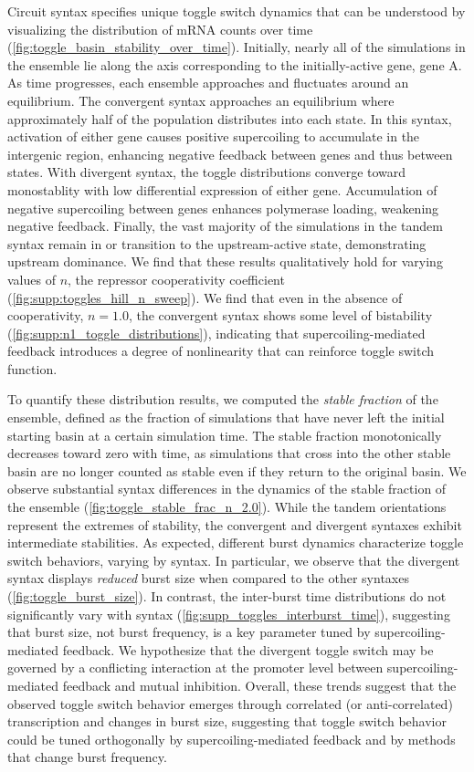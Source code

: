 \documentclass[11pt]{article}
\begin{document}
Circuit syntax specifies unique toggle switch dynamics that can be understood by visualizing the distribution of mRNA counts over time (\cref{fig:toggle_basin_stability_over_time}). Initially, nearly all of the simulations in the ensemble lie along the axis corresponding to the initially-active gene, gene A. As time progresses, each ensemble approaches and fluctuates around an equilibrium.
The convergent syntax approaches an equilibrium where approximately half of the population distributes into each state. In this syntax, activation of either gene causes positive supercoiling to accumulate in the intergenic region, enhancing negative feedback between genes and thus between states. With divergent syntax, the toggle distributions converge toward monostablity with low differential expression of either gene. Accumulation of negative supercoiling between genes enhances polymerase loading, weakening negative feedback. Finally, the vast majority of the simulations in the tandem syntax remain in or transition to the upstream-active state, demonstrating upstream dominance. We find that these results qualitatively hold for varying values of \(n\), the repressor cooperativity coefficient (\cref{fig:supp:toggles_hill_n_sweep}). We find that  even in the absence of cooperativity, \(n = 1.0\), the convergent syntax shows some level of bistability (\cref{fig:supp:n1_toggle_distributions}), indicating that supercoiling-mediated feedback introduces a degree of nonlinearity that can reinforce toggle switch function. 

To quantify these distribution results, we computed the \emph{stable fraction} of the ensemble, defined as the fraction of simulations that have never left the initial starting basin at a certain simulation time.
The stable fraction monotonically decreases toward zero with time, as simulations that cross into the other stable basin are no longer counted as stable even if they return to the original basin.
We observe substantial syntax differences in the dynamics of the stable fraction of the ensemble (\cref{fig:toggle_stable_frac_n_2.0}). While the tandem orientations represent the extremes of stability, the convergent and divergent syntaxes exhibit intermediate stabilities.
As expected, different burst dynamics characterize toggle switch behaviors, varying by syntax. In particular, we observe that the divergent syntax displays \emph{reduced} burst size when compared to the other syntaxes (\cref{fig:toggle_burst_size}). In contrast, the inter-burst time distributions do not significantly vary with syntax (\cref{fig:supp_toggles_interburst_time}), suggesting that burst size, not burst frequency, is a key parameter tuned by supercoiling-mediated feedback. We hypothesize that the divergent toggle switch may be governed by a conflicting interaction at the promoter level between supercoiling-mediated feedback and mutual inhibition.
Overall, these trends suggest that the observed toggle switch behavior emerges through correlated (or anti-correlated) transcription and changes in burst size, suggesting that toggle switch behavior could be tuned orthogonally by supercoiling-mediated feedback and by methods that change burst frequency.
\end{document}
